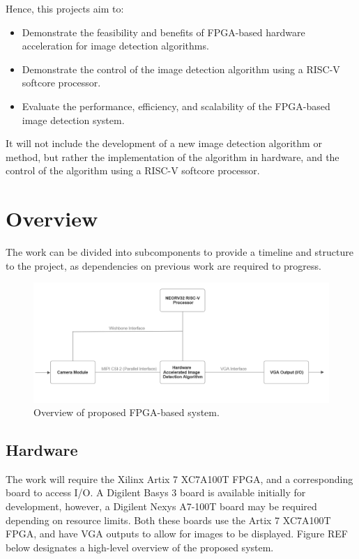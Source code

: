 Hence, this projects aim to:
\begin{itemize}
    \item Demonstrate the feasibility and benefits of FPGA-based hardware acceleration for image detection algorithms.
    \item Demonstrate the control of the image detection algorithm using a RISC-V softcore processor.
    \item Evaluate the performance, efficiency, and scalability of the FPGA-based image detection system.
\end{itemize}

It will not include the development of a new image detection algorithm or method, but rather the implementation of the algorithm in hardware, and the control of the algorithm using a RISC-V softcore processor.

\section{Overview}
The work can be divided into subcomponents to provide a timeline and structure to the project, as dependencies on previous work are required to progress.

\begin{figure}[h]
    \centering
    \includegraphics[width=1\textwidth]{Assets/Overview.png}
    \caption{Overview of proposed FPGA-based system.}
    \label{fig:overview}
\end{figure}

\subsection{Hardware}
The work will require the Xilinx Artix 7 XC7A100T FPGA, and a corresponding board to access I/O.
A Digilent Basys 3 board is available initially for development, however, a Digilent Nexys A7-100T board may be required depending on resource limits.
Both these boards use the Artix 7 XC7A100T FPGA, and have VGA outputs to allow for images to be displayed.
Figure REF below designates a high-level overview of the proposed system.

